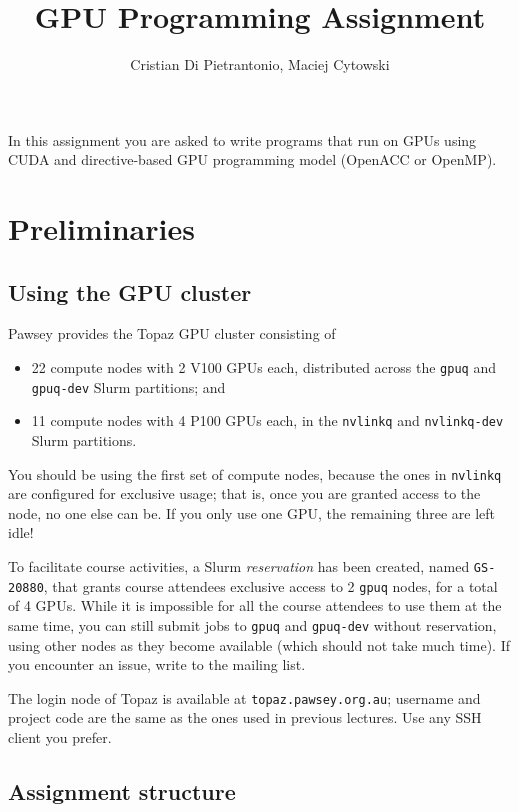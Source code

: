 \documentclass[a4paper, 11pt]{article}
\title{GPU Programming Assignment}
\author{Cristian Di Pietrantonio, Maciej Cytowski}
\begin{document}
	\maketitle
	
	In this assignment you are asked to write programs that run on GPUs using CUDA and directive-based GPU programming model (OpenACC or OpenMP). 
	\section{Preliminaries}
	\subsection{Using the GPU cluster}
	Pawsey provides the Topaz GPU cluster consisting of
	\begin{itemize}
		\item 22 compute nodes with 2 V100 GPUs each, distributed across the \texttt{gpuq} and \texttt{gpuq-dev} Slurm partitions; and
		\item 11 compute nodes with 4 P100 GPUs each, in the \texttt{nvlinkq} and \texttt{nvlinkq-dev} Slurm partitions.
	\end{itemize}
	
	You should be using the first set of compute nodes, because the ones in \texttt{nvlinkq} are configured for exclusive usage; that is, once you are granted access to the node, no one else can be. If you only use one GPU, the remaining three are left idle!
	
	To facilitate course activities, a Slurm \textit{reservation} has been created, named \texttt{GS-20880}, that grants course attendees exclusive access to 2 \texttt{gpuq} nodes, for a total of 4 GPUs. While it is impossible for all the course attendees to use them at the same time, you can still submit jobs to \texttt{gpuq} and \texttt{gpuq-dev} without reservation, using other nodes as they become available (which should not take much time). If you encounter an issue, write to the mailing list.
	
	The login node of Topaz is available at \texttt{topaz.pawsey.org.au}; username and project code are the same as the ones used in previous lectures. Use any SSH client you prefer.
	
	\subsection{Assignment structure}
	
\end{document}
